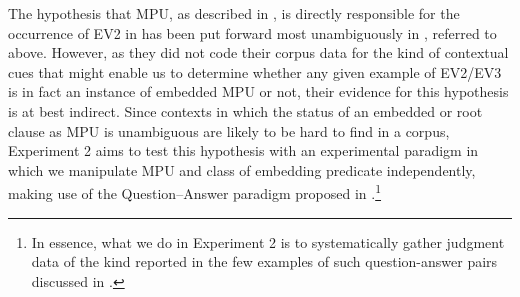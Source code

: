 \documentclass[output=paper]{langsci/langscibook}
\begin{document}

The hypothesis that MPU, as described in \citet{Simons2007}, is directly responsible for the occurrence of EV2 in  has been put forward most unambiguously in \citet{JensenChristensen2013}, referred to above. However, as they did not code their corpus data for the kind of contextual cues that might enable us to determine whether any given example of EV2/EV3 is in fact an instance of embedded MPU or not, their evidence for this hypothesis is at best indirect. Since contexts in which the status of an embedded or root clause as MPU is unambiguous are likely to be hard to find in a corpus, Experiment 2 aims to test this hypothesis with an experimental paradigm in which we manipulate MPU and class of embedding predicate independently, making use of the Question--Answer paradigm proposed in \citet{Simons2007}.\footnote{In essence, what we do in Experiment 2 is to systematically gather judgment data of the kind reported in the few examples of such question-answer pairs discussed in \citet{WiklundEtAl2009}.} 
\end{document}
